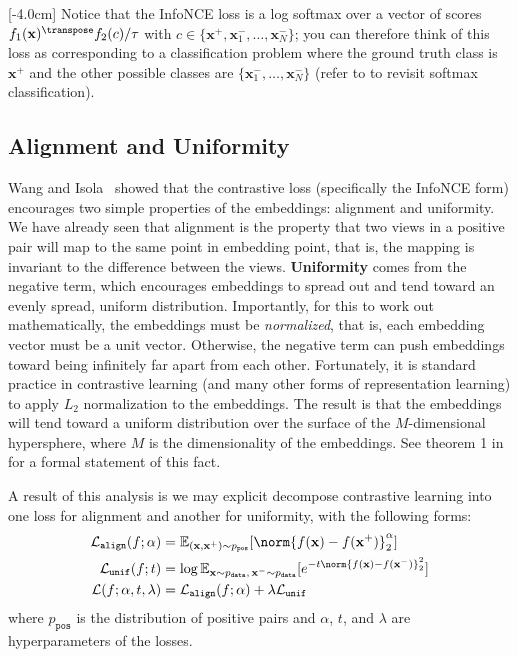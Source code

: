 [-4.0cm]
Notice that the InfoNCE loss is a log softmax over a vector of scores $f_1(\mathbf{x})^\transpose f_2(c)/\tau$ with $c \in \{\mathbf{x}^+, \mathbf{x}_1^-, \ldots, \mathbf{x}_N^-\}$; you can therefore think of this loss as corresponding to a classification problem where the ground truth class is $\mathbf{x}^+$ and the other possible classes are $\{\mathbf{x}_1^-, \ldots, \mathbf{x}_N^-\}$ (refer to \chap{\ref{chapter:intro_to_learning}} to revisit softmax classification).

\subsection{Alignment and Uniformity}
Wang and Isola~\cite{wang2020hypersphere} showed that the contrastive loss (specifically the InfoNCE form) encourages two simple properties of the embeddings: alignment and uniformity. We have already seen that alignment is the property that two views in a positive pair will map to the same point in embedding point, that is, the mapping is invariant to the difference between the views. \textbf{Uniformity} comes from the negative term, which encourages embeddings to spread out and tend toward an evenly spread, uniform distribution. Importantly, for this to work out mathematically, the embeddings must be \textit{normalized}, that is, each embedding vector must be a unit vector. Otherwise, the negative term can push embeddings toward being infinitely far apart from each other. Fortunately, it is standard practice in contrastive learning (and many other forms of representation learning) to apply $L_2$ normalization to the embeddings. The result is that the embeddings will tend toward a uniform distribution over the surface of the $M$-dimensional hypersphere, where $M$ is the dimensionality of the embeddings. See theorem 1 in \cite{wang2020hypersphere} for a formal statement of this fact.

A result of this analysis is we may explicit decompose contrastive learning into one loss for alignment and another for uniformity, with the following forms:
\begin{align}
    \mathcal{L}_{\texttt{align}}(f;\alpha) &= \mathbb{E}_{(\mathbf{x},\mathbf{x}^+) \sim p_{\texttt{pos}}} [\norm{f(\mathbf{x}) - f(\mathbf{x}^+)}_2^{\alpha}]\\
    \mathcal{L}_{\texttt{unif}}(f;t) &= \log \mathbb{E}_{\mathbf{x} \sim p_{\texttt{data}}, \, \mathbf{x}^- \sim p_{\texttt{data}}} [e^{-t\norm{f(\mathbf{x}) - f(\mathbf{x}^-)}_2^2}]\\
    \mathcal{L}(f;\alpha,t,\lambda) &= \mathcal{L}_{\texttt{align}}(f;\alpha) + \lambda \mathcal{L}_{\texttt{unif}}
\end{align}
where $p_{\texttt{pos}}$ is the distribution of positive pairs and $\alpha$, $t$, and $\lambda$ are hyperparameters of the losses.

